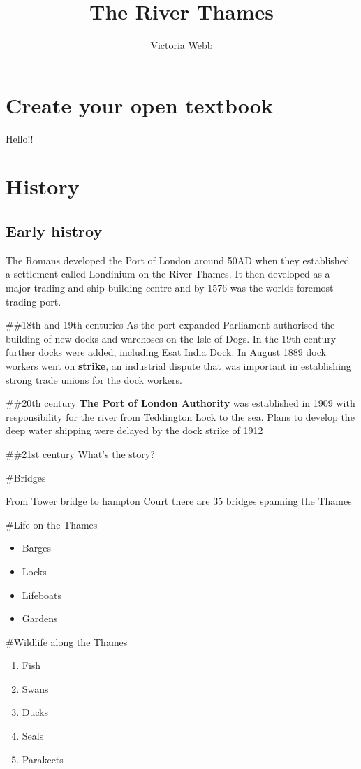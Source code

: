 \documentclass[
  openany]{book}
\title{The River Thames}
\author{Victoria Webb}
\date{}
\providecommand{\tightlist}{%
  \setlength{\itemsep}{0pt}\setlength{\parskip}{0pt}}
\begin{document}
\maketitle

{
\setcounter{tocdepth}{1}
\tableofcontents
}
\hypertarget{create-your-open-textbook}{%
\chapter{Create your open textbook}\label{create-your-open-textbook}}

Hello!!

\hypertarget{history}{%
\chapter{History}\label{history}}

\hypertarget{early-histroy}{%
\section{Early histroy}\label{early-histroy}}

The Romans developed the Port of London around 50AD when they established a settlement called Londinium on the River Thames.
It then developed as a major trading and ship building centre and by 1576 was the worlds foremost trading port.

\#\#18th and 19th centuries
As the port expanded Parliament authorised the building of new docks and warehoses on the Isle of Dogs.
In the 19th century further docks were added, including Esat India Dock.
In August 1889 dock workers went on \textbf{\href{https://en.wikipedia.org/wiki/London_dock_strike,_1889}{strike}}, an industrial dispute that was important in establishing strong trade unions for the dock workers.

\#\#20th century
\textbf{The Port of London Authority} was established in 1909 with responsibility for the river from Teddington Lock to the sea.
Plans to develop the deep water shipping were delayed by the dock strike of 1912

\#\#21st century
What's the story?

\#Bridges

From Tower bridge to hampton Court there are 35 bridges spanning the Thames

\#Life on the Thames

\begin{itemize}
\tightlist
\item
  Barges
\item
  Locks
\item
  Lifeboats
\item
  Gardens
\end{itemize}

\#Wildlife along the Thames

\begin{enumerate}
\def\labelenumi{\arabic{enumi}.}
\tightlist
\item
  Fish
\item
  Swans
\item
  Ducks
\item
  Seals
\item
  Parakeets
\end{enumerate}
\end{document}
